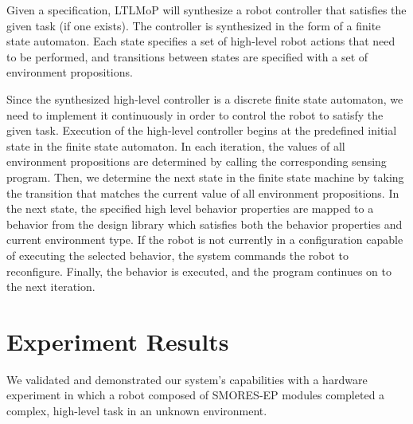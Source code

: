 \documentclass[conference]{IEEEtran}
\newcommand{\lt}{{\tt True }}
\begin{document}
Given a specification,  LTLMoP will synthesize a robot controller that satisfies the given  task (if one exists). The controller is synthesized in the form of a finite state automaton.
Each state specifies a set of high-level robot actions that need to be performed, and transitions between states are specified with a set of environment propositions.

Since the synthesized high-level controller is a discrete finite state automaton, we need to implement it continuously in order to control the robot to satisfy the given task.
Execution of the high-level controller begins at the predefined initial state in the finite state automaton. In each iteration, the values of all environment propositions are determined by calling the corresponding sensing program. Then, we determine the next state in the finite state machine by taking the transition that matches the current value of all environment propositions. 
In the next state, the specified high level behavior properties are mapped to a behavior from the design library which satisfies both the behavior properties and current environment type.
If the robot is not currently in a configuration capable of executing the selected behavior, the system commands the robot to reconfigure. Finally, the behavior is executed, and the program continues on to the next iteration. 



\section{Experiment Results}
\label{sec:experiments}
%

We validated and demonstrated our system's capabilities with a hardware experiment in which a robot composed of SMORES-EP modules completed a complex, high-level task in an unknown environment.
\end{document}
